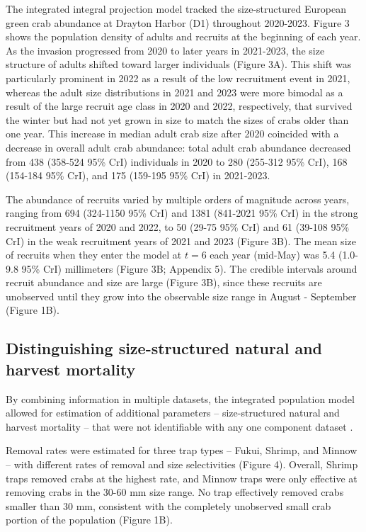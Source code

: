\documentclass{article}
\begin{document}
The integrated integral projection model tracked the size-structured European green crab abundance at Drayton Harbor (D1) throughout 2020-2023. Figure 3 shows the population density of adults and recruits at the beginning of each year. As the invasion progressed from 2020 to later years in 2021-2023, the size structure of adults shifted toward larger individuals (Figure 3A). This shift was particularly prominent in 2022 as a result of the low recruitment event in 2021, whereas the adult size distributions in 2021 and 2023 were more bimodal as a result of the large recruit age class in 2020 and 2022, respectively, that survived the winter but had not yet grown in size to match the sizes of crabs older than one year. This increase in median adult crab size after 2020 coincided with a decrease in overall adult crab abundance: total adult crab abundance decreased from 438 (358-524 95\% CrI) individuals in 2020 to 280 (255-312 95\% CrI), 168 (154-184 95\% CrI), and 175 (159-195 95\% CrI) in 2021-2023.

The abundance of recruits varied by multiple orders of magnitude across years, ranging from 694 (324-1150 95\% CrI) and 1381 (841-2021 95\% CrI) in the strong recruitment years of 2020 and 2022, to 50 (29-75 95\% CrI) and 61 (39-108 95\% CrI) in the weak recruitment years of 2021 and 2023 (Figure 3B). The mean size of recruits when they enter the model at $t = 6$ each year (mid-May) was 5.4 (1.0-9.8 95\% CrI) millimeters (Figure 3B; Appendix 5). The credible intervals around recruit abundance and size are large (Figure 3B), since these recruits are unobserved until they grow into the observable size range in August - September (Figure 1B).

\subsection{Distinguishing size-structured natural and harvest mortality}

By combining information in multiple datasets, the integrated population model allowed for estimation of additional parameters -- size-structured natural and harvest mortality -- that were not identifiable with any one component dataset \parencite{riecke2019integrated}.

Removal rates were estimated for three trap types -- Fukui, Shrimp, and Minnow -- with different rates of removal and size selectivities (Figure 4). Overall, Shrimp traps removed crabs at the highest rate, and Minnow traps were only effective at removing crabs in the 30-60 mm size range. No trap effectively removed crabs smaller than 30 mm, consistent with the completely unobserved small crab portion of the population (Figure 1B).
\end{document}
